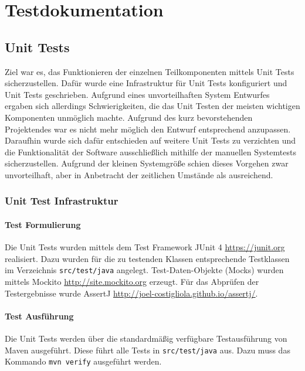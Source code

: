 
\section{Testdokumentation}

\subsection{Unit Tests}
Ziel war es, das Funktionieren der einzelnen Teilkomponenten mittels Unit Tests sicherzustellen. Dafür wurde eine Infrastruktur für Unit Tests konfiguriert und Unit Tests geschrieben. Aufgrund eines unvorteilhaften System Entwurfes ergaben sich allerdings Schwierigkeiten, die das Unit Testen der meisten wichtigen Komponenten unmöglich machte. Aufgrund des kurz bevorstehenden Projektendes war es nicht mehr möglich den Entwurf entsprechend anzupassen. Daraufhin wurde sich dafür entschieden auf weitere Unit Tests zu verzichten und die Funktionalität der Software ausschließlich mithilfe der manuellen Systemtests sicherzustellen. Aufgrund der kleinen Systemgröße schien dieses Vorgehen zwar unvorteilhaft, aber in Anbetracht der zeitlichen Umstände als ausreichend.

\subsubsection{Unit Test Infrastruktur}
\paragraph{Test Formulierung}
Die Unit Tests wurden mittels dem Test Framework JUnit 4 \href{https://junit.org}{https://junit.org} realisiert. Dazu wurden für die zu testenden Klassen entsprechende Testklassen im Verzeichnis \texttt{src/test/java} angelegt. Test-Daten-Objekte (Mocks) wurden mittels Mockito \href{http://site.mockito.org}{http://site.mockito.org} erzeugt. Für das Abprüfen der Testergebnisse wurde AssertJ \href{http://joel-costigliola.github.io/assertj/}{http://joel-costigliola.github.io/assertj/}.
\paragraph{Test Ausführung}
Die Unit Tests werden über die standardmäßig verfügbare Testausführung von Maven ausgeführt. Diese führt alle Tests in \texttt{src/test/java} aus. Dazu muss das Kommando \texttt{mvn verify} ausgeführt werden.

